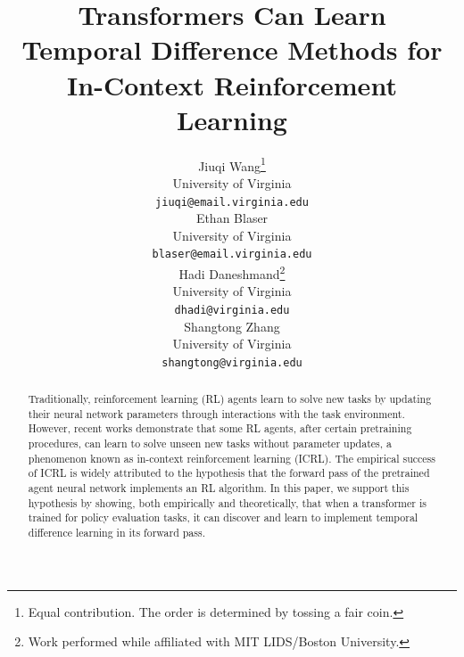 \documentclass{article}
\title{Transformers Can Learn \\ Temporal Difference Methods for \\ In-Context  Reinforcement Learning}
\author{Jiuqi Wang\thanks{Equal contribution. The order is determined by tossing a fair coin.} \\
University of Virginia\\
\texttt{jiuqi@email.virginia.edu} \\
\And
Ethan Blaser\footnotemark[1] \\
University of Virginia \\
\texttt{blaser@email.virginia.edu} \\
\AND
Hadi Daneshmand\footnotemark[2]\thanks{Work performed while affiliated with MIT LIDS/Boston University.} \\
 University of Virginia\\
\texttt{dhadi@virginia.edu} \\
\And
Shangtong Zhang \\
University of Virginia \\
\texttt{shangtong@virginia.edu}}
\begin{document}
\maketitle


\begin{abstract}

Traditionally, reinforcement learning (RL) agents learn to solve new tasks by updating their neural network parameters through interactions with the task environment. However, recent works demonstrate that some RL agents, after certain pretraining procedures, can learn to solve unseen new tasks without parameter updates, a phenomenon known as in-context reinforcement learning (ICRL). The empirical success of ICRL is widely attributed to the hypothesis that the forward pass of the pretrained agent neural network implements an RL algorithm. 
In this paper,
we support this hypothesis by showing, both empirically and theoretically,
that when a transformer is trained for policy evaluation tasks,
it can discover and learn to implement temporal difference learning in its forward pass. %
    

    

\end{abstract}
\end{document}
